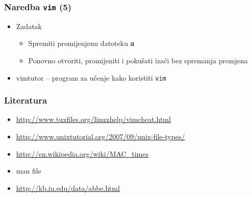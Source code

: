 \documentclass{beamer}
\newcommand{\shell}[1]{\texttt{#1}}
\begin{document}
\begin{frame}[t]
\frametitle{Naredba \shell{vim} (5)}
\begin{itemize}
  \item Zadatak
  \begin{itemize}
    \item Spremiti promijenjenu datoteku \textbf{a}
    \item Ponovno otvoriti, promijeniti i pokušati izaći bez spremanja 
          promjena
  \end{itemize}
  \item vimtutor – program za učenje kako koristiti \shell{vim}
\end{itemize}
\end{frame}

\begin{frame}[t]
\frametitle{Literatura}
\begin{itemize}
  \item \url{http://www.tuxfiles.org/linuxhelp/vimcheat.html}
  \item \url{http://www.unixtutorial.org/2007/09/unix-file-types/}
  \item \url{http://en.wikipedia.org/wiki/MAC\_times}
  \item man file
  \item \url{http://kb.iu.edu/data/abbe.html}
\end{itemize}
\end{frame}
\end{document}
